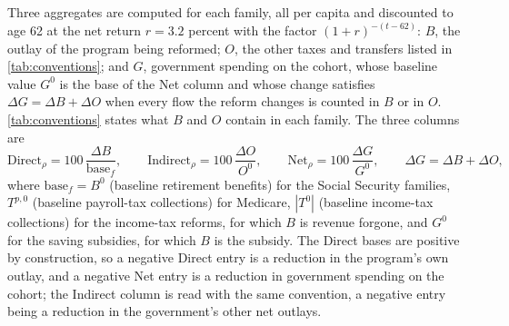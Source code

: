 Three aggregates are computed for each family, all per capita and discounted to age 62 at the net return $r=3.2$ percent with the factor $(1+r)^{-(t-62)}$: $B$, the outlay of the program being reformed; $O$, the other taxes and transfers listed in \autoref{tab:conventions}; and $G$, government spending on the cohort, whose baseline value $G^{0}$ is the base of the Net column and whose change satisfies $\Delta G=\Delta B+\Delta O$ when every flow the reform changes is counted in $B$ or in $O$.
\autoref{tab:conventions} states what $B$ and $O$ contain in each family. The three columns are
\begin{equation}\label{eq:fiscal}
\text{Direct}_{\rho}=100\,\frac{\Delta B}{\text{base}_f},
\qquad
\text{Indirect}_{\rho}=100\,\frac{\Delta O}{O^{0}},
\qquad
\text{Net}_{\rho}=100\,\frac{\Delta G}{G^{0}},
\qquad \Delta G=\Delta B+\Delta O,
\end{equation}
where $\text{base}_f=B^{0}$ (baseline retirement benefits) for the Social Security families, $T^{p,0}$ (baseline payroll-tax collections) for Medicare, $|T^{0}|$ (baseline income-tax collections) for the income-tax reforms, for which $B$ is revenue forgone, and $G^{0}$ for the saving subsidies, for which $B$ is the subsidy. The Direct bases are positive by construction, so a negative Direct entry is a reduction in the program's own outlay, and a negative Net entry is a reduction in government spending on the cohort; the Indirect column is read with the same convention, a negative entry being a reduction in the government's other net outlays.

